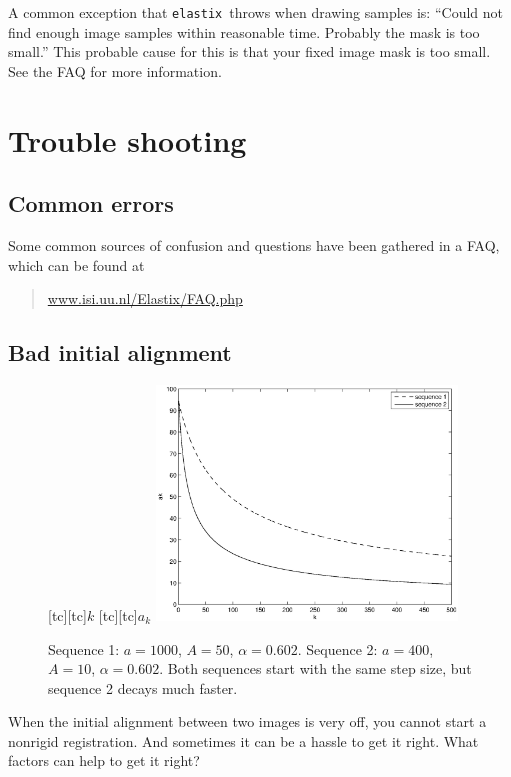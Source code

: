\documentclass[]{report}
\newcommand{\elastix}{\texttt{elastix}}
\begin{document}
A common exception that \elastix\ throws when drawing samples is:
``Could not find enough image samples within reasonable time.
Probably the mask is too small.'' This probable cause for this is
that your fixed image mask is too small. See the FAQ for more
information.

\section{Trouble shooting}

\subsection{Common errors}

Some common sources of confusion and questions have been gathered in
a FAQ, which can be found at
\begin{quote}
\url{www.isi.uu.nl/Elastix/FAQ.php}
\end{quote}

\subsection{Bad initial alignment}

\begin{figure}
\centering {}[tc][tc]{$k$} [tc][tc]{$a_k$}
\includegraphics[width=8cm]{ak.eps}
\caption{Sequence 1: $a = 1000$, $A = 50$, $\alpha = 0.602$.
Sequence 2: $a = 400$, $A = 10$, $\alpha = 0.602$. Both sequences
start with the same step size, but sequence 2 decays much
faster.}\label{fig:ak}
\end{figure}

When the initial alignment between two images is very off, you cannot
start a nonrigid registration. And sometimes it can be a hassle to
get it right. What factors can help to get it right?
\end{document}
